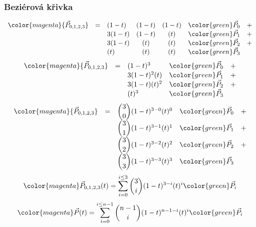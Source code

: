 \begin{frame}
\frametitle{Beziérová křivka}
  {\tiny
  \[
  \begin{array}{lclccrc}
    \color{magenta}{\vec{P}_{0,1,2,3}} &=& (1-t)&(1-t)&(1-t)&{\color{green}\vec{P}_0} &+ \\
                                       & & 3(1-t)&(1-t)&(  t)&{\color{green}\vec{P}_1} &+ \\
                                       & & 3(1-t)&(  t)&(  t)&{\color{green}\vec{P}_2} &+ \\
                                       & & (  t)&(  t)&(  t)&{\color{green}\vec{P}_3} &
  \end{array}
  \]
  }
  {\tiny
  \[
  \begin{array}{lclrc}
    \color{magenta}{\vec{P}_{0,1,2,3}} &=& (1-t)^3&{\color{green}\vec{P}_0} &+ \\
                                       & & 3(1-t)^2(t)&{\color{green}\vec{P}_1} &+ \\
                                       & & 3(1-t)(t)^2&{\color{green}\vec{P}_2} &+ \\
                                       & & (t)^3&{\color{green}\vec{P}_3} &
  \end{array}
  \]
  }
  {\tiny
  \[
  \begin{array}{lclrc}
    \color{magenta}{\vec{P}_{0,1,2,3}} &=& \dbinom{3}{0}(1-t)^{3-0}(t)^{0}&{\color{green}\vec{P}_0} &+ \\
                                       & & \dbinom{3}{1}(1-t)^{3-1}(t)^{1}&{\color{green}\vec{P}_1} &+ \\
                                       & & \dbinom{3}{2}(1-t)^{3-2}(t)^{2}&{\color{green}\vec{P}_2} &+ \\
                                       & & \dbinom{3}{3}(1-t)^{3-3}(t)^{3}&{\color{green}\vec{P}_3} &
  \end{array}
  \]
  }
  {\tiny
  $$
  {\color{magenta}\vec{P}_{0,1,2,3}(t)} = \sum\limits_{i=0}^{i \leq 3}\dbinom{3}{i}(1-t)^{3-i}(t)^{i}{\color{green}\vec{P}_i} 
  $$
  }
  {\tiny
  $$
  {\color{magenta}\vec{P}(t)} = \sum\limits_{i=0}^{i \leq n-1}\dbinom{n-1}{i}(1-t)^{n-1-i}(t)^{i}{\color{green}\vec{P}_i} 
  $$
  }


\end{frame}

